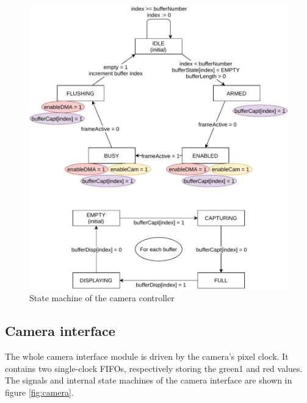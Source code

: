 \documentclass[12pt,a4paper]{article}
\begin{document}
\begin{figure}[ht!]
	\centering
	\includegraphics[width=\textwidth]{figures/syssm}
	\caption{State machine of the camera controller}
	\label{fig:syssm}
\end{figure}

\subsection{Camera interface}

The whole camera interface module is driven by the camera's pixel clock. It contains two single-clock FIFOs, respectively storing the green1 and red values. The signals and internal state machines of the camera interface are shown in figure \ref{fig:camera}.
\end{document}
